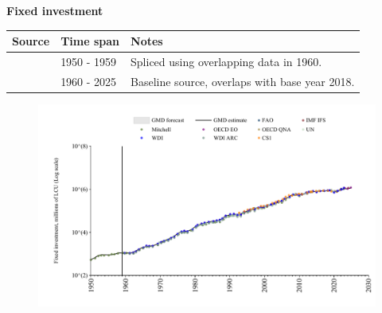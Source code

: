 \documentclass[12pt,a4paper,landscape]{article}
\begin{document}
\begin{adjustbox}{max totalsize={\paperwidth}{\paperheight},center}
\begin{minipage}[t][\textheight][t]{\textwidth}
\vspace*{0.5cm}
{}
\begin{center}
{\Large\bfseries Fixed investment}
\end{center}
\vspace{0.5cm}
\begin{table}[H]
\centering
\small
\begin{tabular}{|l|l|l|}
\hline
\textbf{Source} & \textbf{Time span} & \textbf{Notes} \\
\hline
\rowcolor{white}\cite{Mitchell}& 1950 - 1959 &Spliced using overlapping data in 1960. \\
\rowcolor{lightgray}\cite{OECD_EO}& 1960 - 2025 &Baseline source, overlaps with base year 2018. \\
\hline
\end{tabular}
\end{table}
\begin{figure}[H]
\centering
\includegraphics[width=\textwidth,height=0.6\textheight,keepaspectratio]{graphs/ZAF_finv.pdf}
\end{figure}
\end{minipage}
\end{adjustbox}
\end{document}

